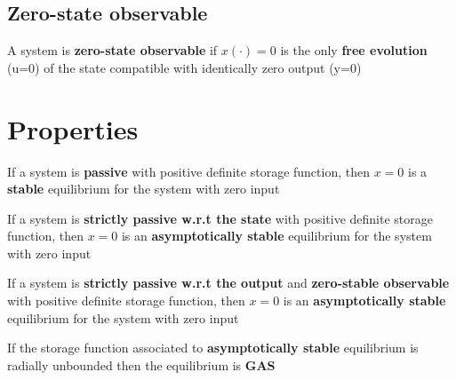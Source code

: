 \subsection{Zero-state observable}

A system is \textbf{zero-state observable} if $x(\cdot) = 0$ is the only \textbf{free evolution} (u=0) of the state compatible with identically zero output (y=0)

\section{Properties}

\begin{theorem}
    If a system is \textbf{passive} with positive definite storage function, then $x=0$ is a \textbf{stable} equilibrium for the system with zero input
\end{theorem}

\begin{theorem}
    If a system is \textbf{strictly passive w.r.t the state} with positive definite storage function, then $x=0$ is an \textbf{asymptotically stable} equilibrium for the system with zero input
\end{theorem}

\begin{theorem}
    If a system is \textbf{strictly passive w.r.t the output} and \textbf{zero-stable observable} with positive definite storage function, then $x=0$ is an \textbf{asymptotically stable} equilibrium for the system with zero input
\end{theorem}

\begin{theorem}
    If the storage function associated to \textbf{asymptotically stable} equilibrium is radially unbounded then the equilibrium is \textbf{GAS}
\end{theorem}
